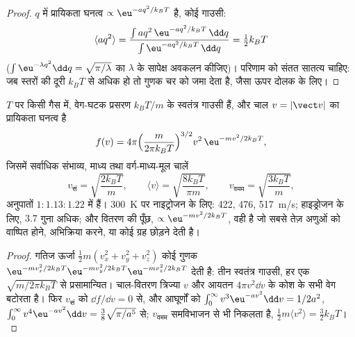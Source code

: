 \begin{proof}
$q$ में प्रायिकता घनत्व $\propto\eu^{-aq^2/k_BT}$ है, कोई गाउसी:
\[
\langle aq^2\rangle = \frac{\int aq^2\,\eu^{-aq^2/k_BT}\,\dd q}{\int\eu^{-aq^2/k_BT}\,\dd q} = \tfrac12k_BT
\]
($\int\eu^{-\lambda q^2}\dd q = \sqrt{\pi/\lambda}$ का $\lambda$ के सापेक्ष
अवकलन कीजिए)। परिणाम को संतत सातत्य चाहिए: जब
स्तरों की दूरी $k_BT$ से अधिक हो तो गुणक चर को जमा देता है,
जैसा ऊपर दोलक के लिए।
\end{proof}

\begin{theorem}[मैक्सवेल का चालों का वितरण]\label{thm:b2:boltzmann-factor:maxwell}
$T$ पर किसी गैस में, वेग-घटक प्रसरण $k_BT/m$ के स्वतंत्र गाउसी हैं,
और चाल $v = |\vect v|$ का प्रायिकता
घनत्व है
\[
f(v) = 4\pi\Big(\frac{m}{2\pi k_BT}\Big)^{3/2}v^2\,\eu^{-mv^2/2k_BT} ,
\]
जिसमें सर्वाधिक संभाव्य, माध्य तथा वर्ग-माध्य-मूल चालें
\[
v_{\text{सं}} = \sqrt{\frac{2k_BT}{m}}, \qquad
\langle v\rangle = \sqrt{\frac{8k_BT}{\pi m}}, \qquad
v_{\text{वमम}} = \sqrt{\frac{3k_BT}{m}} ,
\]
अनुपातों $1 : 1.13 : 1.22$ में हैं। \qty{300}{K} पर नाइट्रोजन के लिए: \qty{422}{},
\qty{476}{}, \qty{517}{m/s}; हाइड्रोजन के लिए, $3.7$ गुना अधिक; और
वितरण की पूँछ, $\propto\eu^{-mv^2/2k_BT}$, वही है जो
सबसे तेज़ अणुओं को वाष्पित होने, अभिक्रिया करने, या कोई ग्रह छोड़ने देती है।
\end{theorem}

\begin{proof}
गतिज ऊर्जा $\tfrac12m(v_x^2 + v_y^2 + v_z^2)$ कोई गुणक
$\eu^{-mv_x^2/2k_BT}\eu^{-mv_y^2/2k_BT}\eu^{-mv_z^2/2k_BT}$ देती है: तीन स्वतंत्र
गाउसी, हर एक $\sqrt{m/2\pi k_BT}$ से प्रसामान्यित। चाल-वितरण
त्रिज्या $v$ और आयतन $4\pi v^2\dd v$ के कोश के सभी वेग बटोरता
है। फिर $v_{\text{सं}}$ को $\dd f/\dd v = 0$ से, और
आघूर्णों को $\int_0^\infty v^3\eu^{-av^2}\dd v = 1/2a^2$, $\int_0^\infty
v^4\eu^{-av^2}\dd v = \tfrac38\sqrt{\pi/a^5}$ से; $v_{\text{वमम}}$ समविभाजन से भी
निकलता है, $\tfrac12m\langle v^2\rangle = \tfrac32k_BT$।
\end{proof}


